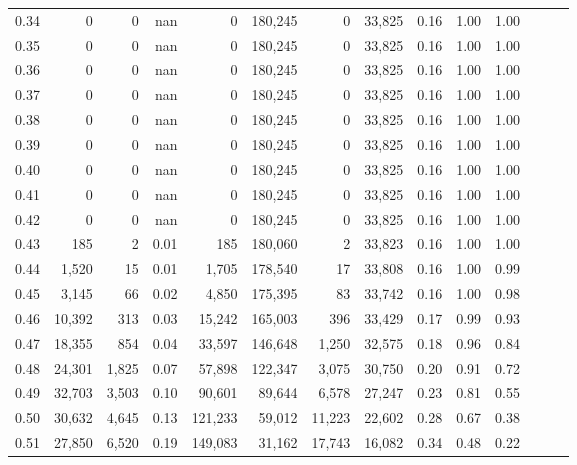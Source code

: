 \begin{tabular}{rrrrrrrrrrrrrr}
0.34 &       0 &      0 &   nan &        0 &  180,245 &       0 &  33,825 &  0.16 &  1.00 &      1.00 \\
0.35 &       0 &      0 &   nan &        0 &  180,245 &       0 &  33,825 &  0.16 &  1.00 &      1.00 \\
0.36 &       0 &      0 &   nan &        0 &  180,245 &       0 &  33,825 &  0.16 &  1.00 &      1.00 \\
0.37 &       0 &      0 &   nan &        0 &  180,245 &       0 &  33,825 &  0.16 &  1.00 &      1.00 \\
0.38 &       0 &      0 &   nan &        0 &  180,245 &       0 &  33,825 &  0.16 &  1.00 &      1.00 \\
0.39 &       0 &      0 &   nan &        0 &  180,245 &       0 &  33,825 &  0.16 &  1.00 &      1.00 \\
0.40 &       0 &      0 &   nan &        0 &  180,245 &       0 &  33,825 &  0.16 &  1.00 &      1.00 \\
0.41 &       0 &      0 &   nan &        0 &  180,245 &       0 &  33,825 &  0.16 &  1.00 &      1.00 \\
0.42 &       0 &      0 &   nan &        0 &  180,245 &       0 &  33,825 &  0.16 &  1.00 &      1.00 \\
0.43 &     185 &      2 &  0.01 &      185 &  180,060 &       2 &  33,823 &  0.16 &  1.00 &      1.00 \\
0.44 &   1,520 &     15 &  0.01 &    1,705 &  178,540 &      17 &  33,808 &  0.16 &  1.00 &      0.99 \\
0.45 &   3,145 &     66 &  0.02 &    4,850 &  175,395 &      83 &  33,742 &  0.16 &  1.00 &      0.98 \\
0.46 &  10,392 &    313 &  0.03 &   15,242 &  165,003 &     396 &  33,429 &  0.17 &  0.99 &      0.93 \\
0.47 &  18,355 &    854 &  0.04 &   33,597 &  146,648 &   1,250 &  32,575 &  0.18 &  0.96 &      0.84 \\
0.48 &  24,301 &  1,825 &  0.07 &   57,898 &  122,347 &   3,075 &  30,750 &  0.20 &  0.91 &      0.72 \\
0.49 &  32,703 &  3,503 &  0.10 &   90,601 &   89,644 &   6,578 &  27,247 &  0.23 &  0.81 &      0.55 \\
0.50 &  30,632 &  4,645 &  0.13 &  121,233 &   59,012 &  11,223 &  22,602 &  0.28 &  0.67 &      0.38 \\
0.51 &  27,850 &  6,520 &  0.19 &  149,083 &   31,162 &  17,743 &  16,082 &  0.34 &  0.48 &      0.22 \\

\end{tabular}
